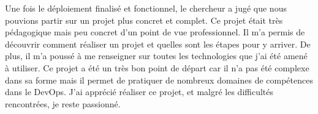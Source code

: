 Une fois le déploiement finalisé et fonctionnel, le chercheur a jugé que nous pouvions partir sur un projet plus concret et complet. Ce projet était très pédagogique mais peu concret d’un point de vue professionnel. Il m’a permis de découvrir comment réaliser un projet et quelles sont les étapes pour y arriver. De plus, il m’a poussé à me renseigner sur toutes les technologies que j’ai été amené à utiliser. Ce projet a été un très bon point de départ car il n’a pas été complexe dans sa forme mais il permet de pratiquer de nombreux domaines de compétences dans le DevOps. J’ai apprécié réaliser ce projet, et malgré les difficultés rencontrées, je reste passionné.
